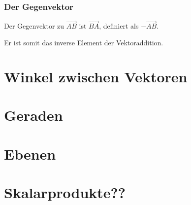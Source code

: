 \subsubsection{Der Gegenvektor}
Der Gegenvektor zu $\vec{AB}$ ist $\vec{BA}$, definiert als  $-\vec{AB}$.
\begin{Bemerkung}
Er ist somit das inverse Element der Vektoraddition.
\end{Bemerkung}
\section{Winkel zwischen Vektoren}
\section{Geraden}
\section{Ebenen}
\section{Skalarprodukte??}
